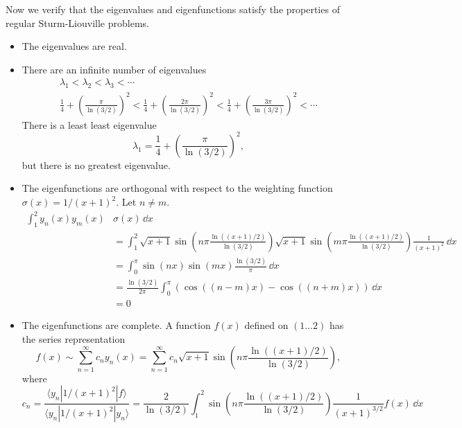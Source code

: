 {\begin{Solution}
  Now we verify that the eigenvalues and eigenfunctions satisfy the properties
  of regular Sturm-Liouville problems.
  \begin{itemize}
  \item
    The eigenvalues are real.
  \item
    There are an infinite number of eigenvalues
    \begin{gather*}
      \lambda_1 < \lambda_2 < \lambda_3 < \cdots \\
      \frac{1}{4} + \left( \frac{\pi}{\ln(3/2)} \right)^2 <
      \frac{1}{4} + \left( \frac{2 \pi}{\ln(3/2)} \right)^2 <
      \frac{1}{4} + \left( \frac{3 \pi}{\ln(3/2)} \right)^2 < \cdots
    \end{gather*}
    There is a least least eigenvalue
    \[
    \lambda_1 = \frac{1}{4} + \left( \frac{\pi}{\ln(3/2)} \right)^2,
    \]
    but there is no greatest eigenvalue.
  \item
    The eigenfunctions are orthogonal with respect to the weighting function
    $\sigma(x) = 1/(x+1)^2$.  Let $n \neq m$.
    \begin{align*}
      \int_1^2 y_n(x) y_m(x) &\sigma(x)\,\dd x \\
      &= \int_1^2 \sqrt{x+1} \sin 
      \left( n \pi \frac{\ln((x+1)/2)}{\ln(3/2)} \right) 
      \sqrt{x+1} \sin 
      \left( m \pi \frac{\ln((x+1)/2)}{\ln(3/2)} \right) 
      \frac{1}{(x+1)^2} \,\dd x \\
      &= \int_0^\pi \sin(n x) \sin(m x) \frac{\ln(3/2)}{\pi} \,\dd x \\
      &= \frac{\ln(3/2)}{2 \pi} \int_0^\pi ( \cos((n-m) x) 
      - \cos((n+m) x) ) \,\dd x \\
      &= 0
    \end{align*}
  \item
    The eigenfunctions are complete. 
    A function $f(x)$ defined on $(1 \ldots 2)$ has the series representation
    \[
    f(x) \sim \sum_{n = 1}^\infty c_n y_n(x)
    = \sum_{n = 1}^\infty c_n \sqrt{x+1} 
    \sin \left( n \pi \frac{ \ln((x+1)/2) }{ \ln(3/2) } \right),
    \]
    where
    \[
    c_n = \frac{\langle y_n | 1/(x+1)^2 | f \rangle}{\langle y_n | 1/(x+1)^2 | y_n \rangle}
    = \frac{2}{\ln(3/2)} \int_1^2 \sin 
    \left( n \pi \frac{\ln((x+1)/2)}{\ln(3/2)} \right) 
    \frac{1}{(x+1)^{3/2}} f(x) \,\dd x
    \]
  \end{itemize}
\end{Solution}







}
